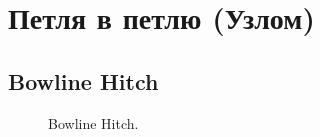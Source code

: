 \section{Петля в петлю (Узлом)}

\subsection{Bowline Hitch}


\begin{figure}[H]\centering
	\begin{minipage}{1\linewidth}
		\begin{center}
			\tcbox[enhanced jigsaw,colframe=black,opacityframe=0.5,opacityback=0.5]
			{\centering{}}
		\end{center}
	\end{minipage}
	\caption{Bowline Hitch.}
	\label{ris:Bowline_Hitch}
\end{figure}
